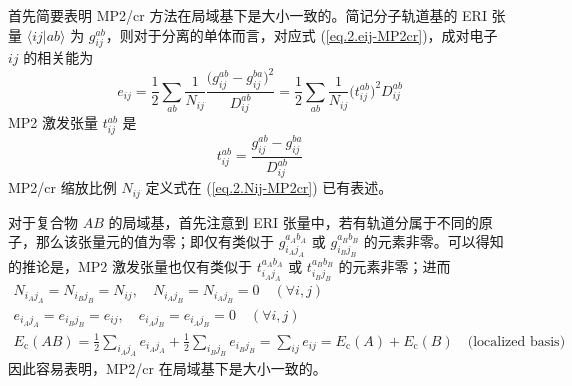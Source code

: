 首先简要表明 MP2/cr 方法在局域基下是大小一致的。简记分子轨道基的 ERI 张量 $\langle ij | ab \rangle$ 为 $g_{ij}^{ab}$，则对于分离的单体而言，对应式 (\ref{eq.2.eij-MP2cr})，成对电子 $ij$ 的相关能为
\begin{equation*}
  e_{ij} = \frac{1}{2} \sum_{ab} \frac{1}{N_{ij}} \frac{\big( g_{ij}^{ab} - g_{ij}^{ba} \big)^2}{D_{ij}^{ab}} = \frac{1}{2} \sum_{ab} \frac{1}{N_{ij}} \big( t_{ij}^{ab} \big)^2 D_{ij}^{ab}
\end{equation*}
MP2 激发张量 $t_{ij}^{ab}$ 是
\begin{equation*}
  t_{ij}^{ab} = \frac{g_{ij}^{ab} - g_{ij}^{ba}}{D_{ij}^{ab}}
\end{equation*}
MP2/cr 缩放比例 $N_{ij}$ 定义式在 (\ref{eq.2.Nij-MP2cr}) 已有表述。

对于复合物 $AB$ 的局域基，首先注意到 ERI 张量中，若有轨道分属于不同的原子，那么该张量元的值为零；即仅有类似于 $g_{i_A j_A}^{a_A b_A}$ 或 $g_{i_B j_B}^{a_B b_B}$ 的元素非零。可以得知的推论是，MP2 激发张量也仅有类似于 $t_{i_A j_A}^{a_A b_A}$ 或 $t_{i_B j_B}^{a_B b_B}$ 的元素非零；进而
\begin{gather*}
  N_{i_A j_A} = N_{i_B j_B} = N_{ij}, \quad N_{i_A j_B} = N_{i_A j_B} = 0 \quad (\forall i, j) \\
  e_{i_A j_A} = e_{i_B j_B} = e_{ij}, \quad e_{i_A j_B} = e_{i_A j_B} = 0 \quad (\forall i, j) \\
  E_\mathrm{c} (AB) = \frac{1}{2} \sum_{i_A j_A} e_{i_A j_A} + \frac{1}{2} \sum_{i_B j_B} e_{i_B j_B} = \sum_{ij} e_{ij} = E_\mathrm{c} (A) + E_\mathrm{c} (B) \quad \text{(localized basis)}
\end{gather*}
因此容易表明，MP2/cr 在局域基下是大小一致的。

